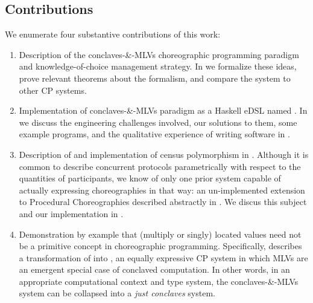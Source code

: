 \subsection{Contributions}
We enumerate four substantive contributions of this work:
\begin{enumerate}
	\item Description of the conclaves-\&-MLVs choreographic programming paradigm and knowledge-of-choice management strategy.
		In  we formalize these ideas,
		prove relevant theorems about the formalism,
		and compare the system to other CP systems.
	\item Implementation of conclaves-\&-MLVs paradigm as a Haskell eDSL named \MultiChor.
		In  we discuss the engineering challenges involved,
		our solutions to them,
		some example programs,
		and the qualitative experience of writing software in \MultiChor.
	\item Description of and implementation of census polymorphism in \MultiChor.
		Although it is common to describe concurrent protocols parametrically with respect to the quantities of participants,
		we know of only one prior system capable of actually expressing choreographies in that way:
		an un-implemented extension to Procedural Choreographies described abstractly in \cite{cp_practice_cruz_filipe_montesi}.
		We discus this subject and our implementation in .
	\item Demonstration by example that (multiply or singly) located values need not be a primitive concept in choreographic programming.
		Specifically,  describes a transformation of \MultiChor into \minichor,
		an equally expressive CP system in which MLVs are an emergent special case of conclaved computation.
		In other words, in an appropriate computational context and type system, the conclaves-\&-MLVs system
		can be collapsed into a \emph{just conclaves} system.
\end{enumerate}

